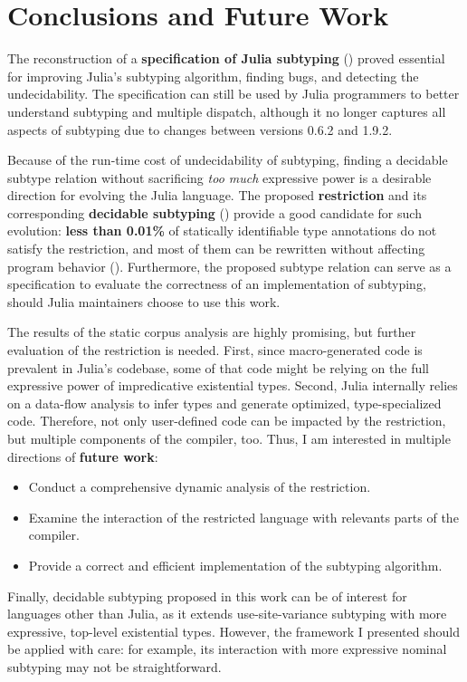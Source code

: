 \chapter{Conclusions and Future Work}

The reconstruction of a \textbf{specification of Julia subtyping}
()
proved essential for improving Julia's subtyping algorithm, 
finding bugs, and detecting the undecidability.
The specification can still be used by Julia programmers to better understand
subtyping and multiple dispatch, although it no longer captures all aspects of 
subtyping due to changes between versions 0.6.2 and 1.9.2.

Because of the run-time cost of undecidability of subtyping,
finding a decidable subtype relation without sacrificing \emph{too much}
expressive power is a desirable direction for evolving the Julia language.
The proposed \textbf{restriction} and its corresponding 
\textbf{decidable subtyping} ()
provide a good candidate for such evolution: 
\textbf{less than 0.01\%} of statically
identifiable type annotations do not satisfy the restriction, and most of them
can be rewritten without affecting program behavior
().
Furthermore, the proposed subtype relation can serve as a specification
to evaluate the correctness of an implementation of subtyping,
should Julia maintainers choose to use this work.

The results of the static corpus analysis are highly promising,
but further evaluation of the restriction is needed. 
First, since macro-generated code is prevalent in Julia's codebase,
some of that code might be relying on the full expressive power
of impredicative existential types.
Second, Julia internally relies on a data-flow analysis
to infer types and generate optimized, type-specialized code. Therefore,
not only user-defined code can be impacted by the restriction, but multiple 
components of the compiler, too. 
Thus, I am interested in multiple directions of \textbf{future work}:
\begin{itemize}
    \item Conduct a comprehensive dynamic analysis of the restriction.
    \item Examine the interaction of the restricted language with relevants
        parts of the compiler.
    \item Provide a correct and efficient implementation of the subtyping
        algorithm.
\end{itemize}

Finally, decidable subtyping proposed in this work can be of interest for
languages other than Julia, as it extends use-site-variance subtyping 
with more expressive, top-level existential types.
However, the framework I presented should be applied with care:
for example, its interaction with more expressive nominal subtyping
may not be straightforward.
